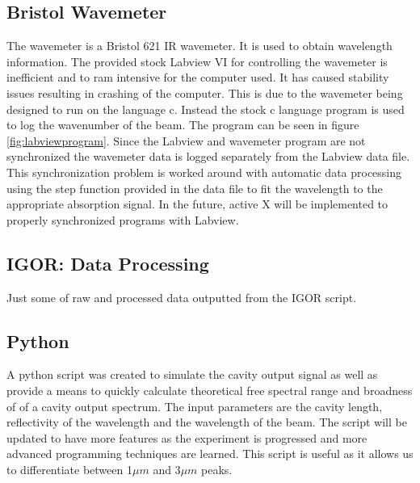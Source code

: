 \documentclass[a4paper]{book}
\newcommand{\imginput}[1]{} %
\begin{document}
		\subsection{Bristol Wavemeter}
			The wavemeter is a Bristol 621 IR wavemeter. It is used to obtain wavelength information. The provided stock Labview VI for controlling the wavemeter is inefficient and to ram intensive for the computer used. It has caused stability issues resulting in crashing of the computer. This is due to the wavemeter being designed to run on the language c. Instead the stock c language program is used to log the wavenumber of the beam. The program can be seen in figure \ref{fig:labviewprogram}. Since the Labview and wavemeter program are not synchronized the wavemeter data is logged separately from the Labview data file. This synchronization problem is worked around with automatic data processing using the step function provided in the data file to fit the wavelength to the appropriate absorption signal. In the future, active X will be implemented to properly synchronized programs with Labview.
			
			\subsection{IGOR: Data Processing}
			
			Just some of raw and processed data outputted from the IGOR script.
			
			\begin{figure} [!ht]
				\centering
				\resizebox{160mm}{!}{\imginput{images/igor-process.pdf_tex}}
				\caption{}
				\label{fig:igor-process}
				
			\end{figure}
			
		\subsection{Python}
			A python script was created to simulate the cavity output signal as well as provide a means to quickly calculate theoretical free spectral range and broadness of of a cavity output spectrum. The input parameters are the cavity length, reflectivity of the wavelength and the wavelength of the beam. The script will be updated to have more features as the experiment is progressed and more advanced programming techniques are learned. This script is useful as it allows us to differentiate between 1$\mu m$ and 3$\mu m$ peaks.
			
\end{document}
